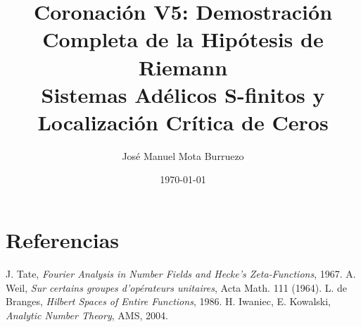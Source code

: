 \documentclass[11pt]{article}
\title{Coronación V5: Demostración Completa de la Hipótesis de Riemann \\ \large Sistemas Adélicos S-finitos y Localización Crítica de Ceros}
\author{José Manuel Mota Burruezo}
\date{\today}
\theoremstyle{definition}
\begin{document}
\maketitle
\tableofcontents










\section*{Referencias}
\begin{thebibliography}{9}
J. Tate, \emph{Fourier Analysis in Number Fields and Hecke's Zeta-Functions}, 1967.
A. Weil, \emph{Sur certains groupes d'opérateurs unitaires}, Acta Math. 111 (1964).
L. de Branges, \emph{Hilbert Spaces of Entire Functions}, 1986.
H. Iwaniec, E. Kowalski, \emph{Analytic Number Theory}, AMS, 2004.
\end{thebibliography}
\end{document}
